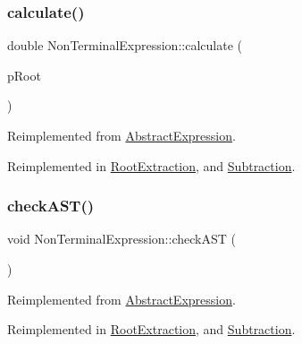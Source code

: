 \mbox{\label{class_non_terminal_expression_a41f5031f53384915aef5c19a88671afe}} 
\subsubsection{\texorpdfstring{calculate()}{calculate()}}
{\footnotesize\ttfamily double Non\+Terminal\+Expression\+::calculate (\begin{DoxyParamCaption}\item[{std\+::unique\+\_\+ptr$<$ \mbox{\hyperlink{class_abstract_expression}{Abstract\+Expression}} $>$ \&}]{p\+Root }\end{DoxyParamCaption})\hspace{0.3cm}{\ttfamily [virtual]}}



Reimplemented from \mbox{\hyperlink{class_abstract_expression_a1c9871ee669668c2eb9f1f1a7d6f5d32}{Abstract\+Expression}}.



Reimplemented in \mbox{\hyperlink{class_root_extraction_ac1c92d2ec68a385f64c828a1a2ff94fa}{Root\+Extraction}}, and \mbox{\hyperlink{class_subtraction_a45931b8ab5514a4517ac2533f50d5235}{Subtraction}}.

\mbox{\label{class_non_terminal_expression_a04d61bbfb066afe1c603396e9e69c397}} 
\subsubsection{\texorpdfstring{checkAST()}{checkAST()}}
{\footnotesize\ttfamily void Non\+Terminal\+Expression\+::check\+A\+ST (\begin{DoxyParamCaption}{ }\end{DoxyParamCaption})\hspace{0.3cm}{\ttfamily [virtual]}}



Reimplemented from \mbox{\hyperlink{class_abstract_expression_a703563fdf65d18ce4b7f2817e2ff4581}{Abstract\+Expression}}.



Reimplemented in \mbox{\hyperlink{class_root_extraction_aadc4dbcddb8993df4556b08543ab5d3a}{Root\+Extraction}}, and \mbox{\hyperlink{class_subtraction_a0139d9c18eb7d87fc2f30ca4a6ea114e}{Subtraction}}.

